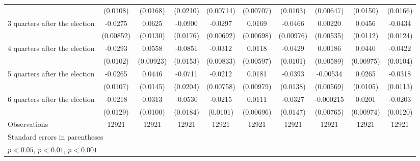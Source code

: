 \begin{table}[htbp]
\begin{tabular}{l*{9}{c}}
                    &    (0.0108)         &    (0.0168)         &    (0.0210)         &   (0.00714)         &   (0.00707)         &    (0.0103)         &   (0.00647)         &    (0.0150)         &    (0.0166)         \\
[1em]
 3 quarters after the election&     -0.0275\sym{**} &      0.0625\sym{***}&     -0.0900\sym{***}&     -0.0297\sym{***}&      0.0169\sym{*}  &     -0.0466\sym{***}&     0.00220         &      0.0456\sym{***}&     -0.0434\sym{***}\\
                    &   (0.00852)         &    (0.0130)         &    (0.0176)         &   (0.00692)         &   (0.00698)         &   (0.00976)         &   (0.00535)         &    (0.0112)         &    (0.0124)         \\
[1em]
 4 quarters after the election&     -0.0293\sym{**} &      0.0558\sym{***}&     -0.0851\sym{***}&     -0.0312\sym{***}&      0.0118\sym{*}  &     -0.0429\sym{***}&     0.00186         &      0.0440\sym{***}&     -0.0422\sym{***}\\
                    &    (0.0102)         &   (0.00923)         &    (0.0153)         &   (0.00833)         &   (0.00597)         &    (0.0101)         &   (0.00589)         &   (0.00975)         &    (0.0104)         \\
[1em]
 5 quarters after the election&     -0.0265\sym{*}  &      0.0446\sym{**} &     -0.0711\sym{***}&     -0.0212\sym{**} &      0.0181         &     -0.0393\sym{**} &    -0.00534         &      0.0265\sym{*}  &     -0.0318\sym{**} \\
                    &    (0.0107)         &    (0.0145)         &    (0.0204)         &   (0.00758)         &   (0.00979)         &    (0.0138)         &   (0.00569)         &    (0.0105)         &    (0.0113)         \\
[1em]
 6 quarters after the election&     -0.0218         &      0.0313\sym{**} &     -0.0530\sym{**} &     -0.0215\sym{*}  &      0.0111         &     -0.0327\sym{*}  &   -0.000215         &      0.0201\sym{*}  &     -0.0203         \\
                    &    (0.0129)         &    (0.0100)         &    (0.0184)         &    (0.0101)         &   (0.00696)         &    (0.0147)         &   (0.00765)         &   (0.00974)         &    (0.0120)         \\
\hline
Observations        &       12921         &       12921         &       12921         &       12921         &       12921         &       12921         &       12921         &       12921         &       12921         \\
\hline\hline
\multicolumn{10}{l}{\footnotesize Standard errors in parentheses}\\
\multicolumn{10}{l}{\footnotesize \sym{*} \(p<0.05\), \sym{**} \(p<0.01\), \sym{***} \(p<0.001\)}\\
\end{tabular}
\end{table}
